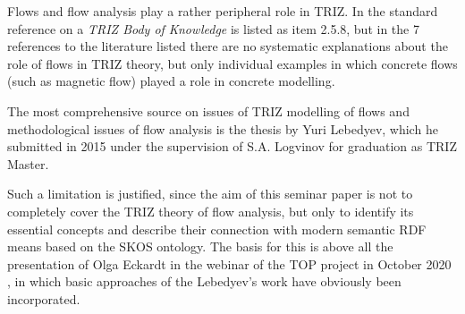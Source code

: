 \documentclass[a4paper,11pt]{article}
\begin{document}
    Flows and flow analysis play a rather peripheral role in TRIZ.  In the
    standard reference \cite{Petrov2007} on a \emph{TRIZ Body of Knowledge} is
    listed as item 2.5.8, but in the 7 references to the literature listed there
    are no systematic explanations about the role of flows in TRIZ theory, but
    only individual examples in which concrete flows (such as magnetic flow)
    played a role in concrete modelling.

    The most comprehensive source on issues of TRIZ modelling of flows and
    methodological issues of flow analysis is the thesis \cite{Lebedyev2015} by
    Yuri Lebedyev, which he submitted in 2015 under the supervision of S.A. 
    Logvinov for graduation as TRIZ Master.

    Such a limitation is justified, since the aim of this seminar paper is not to
    completely cover the TRIZ theory of flow analysis, but only to identify its
    essential concepts and describe their connection with modern semantic RDF
    means based on the SKOS ontology. The basis for this is above all the
    presentation of Olga Eckardt in the webinar of the TOP project in October 2020
    \cite{Eckardt2020}, in which basic approaches of the Lebedyev's work have
    obviously been incorporated.
\end{document}
